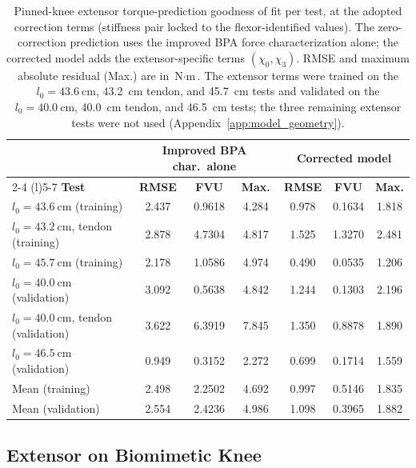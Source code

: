 \begin{table}[htbp]
\caption{Pinned-knee extensor torque-prediction goodness of fit per test, at the adopted correction terms (stiffness pair locked to the flexor-identified values). The zero-correction prediction uses the improved BPA force characterization alone; the corrected model adds the extensor-specific terms $(\chi_{0}, \chi_{3})$. RMSE and maximum absolute residual (Max.) are in $\text{N}\cdot\text{m}$. The extensor terms were trained on the $l_{0}=\qty{43.6}{\cm}$, \qty{43.2}{\cm} tendon, and \qty{45.7}{\cm} tests and validated on the $l_{0}=\qty{40.0}{\cm}$, \qty{40.0}{\cm} tendon, and \qty{46.5}{\cm} tests; the three remaining extensor tests were not used (Appendix~\ref{app:model_geometry}).}
\label{tab:ExtPinGof}
\begin{tabular}{@{}lcccccc@{}}
\toprule
& \multicolumn{3}{c}{\textbf{Improved BPA char.\ alone}} & \multicolumn{3}{c}{\textbf{Corrected model}} \\
\cmidrule(lr){2-4} \cmidrule(l){5-7}
\textbf{Test} & \textbf{RMSE} & \textbf{FVU} & \textbf{Max.} & \textbf{RMSE} & \textbf{FVU} & \textbf{Max.} \\
\midrule
$l_{0}=\qty{43.6}{\cm}$ (training)        & 2.437 & 0.9618 & 4.284 & 0.978 & 0.1634 & 1.818 \\
$l_{0}=\qty{43.2}{\cm}$, tendon (training) & 2.878 & 4.7304 & 4.817 & 1.525 & 1.3270 & 2.481 \\
$l_{0}=\qty{45.7}{\cm}$ (training)         & 2.178 & 1.0586 & 4.974 & 0.490 & 0.0535 & 1.206 \\
$l_{0}=\qty{40.0}{\cm}$ (validation)       & 3.092 & 0.5638 & 4.842 & 1.244 & 0.1303 & 2.196 \\
$l_{0}=\qty{40.0}{\cm}$, tendon (validation) & 3.622 & 6.3919 & 7.845 & 1.350 & 0.8878 & 1.890 \\
$l_{0}=\qty{46.5}{\cm}$ (validation)       & 0.949 & 0.3152 & 2.272 & 0.699 & 0.1714 & 1.559 \\
\midrule
Mean (training)                           & 2.498 & 2.2502 & 4.692 & 0.997 & 0.5146 & 1.835 \\
Mean (validation)                        & 2.554 & 2.4236 & 4.986 & 1.098 & 0.3965 & 1.882 \\
\bottomrule
\end{tabular}
\end{table} 


\subsection{Extensor on Biomimetic Knee}


